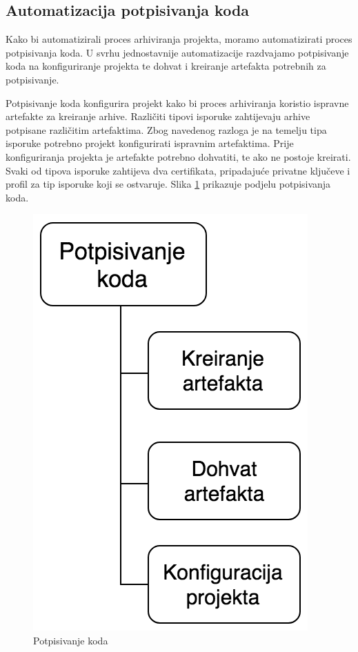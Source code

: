 \documentclass[times, utf8, diplomski, numeric]{fer}
\begin{document}
\subsection{Automatizacija potpisivanja koda}

Kako bi automatizirali proces arhiviranja projekta, moramo automatizirati proces potpisivanja koda. U svrhu jednostavnije automatizacije razdvajamo potpisivanje koda na konfiguriranje projekta te dohvat i kreiranje artefakta potrebnih za potpisivanje.

Potpisivanje koda konfigurira projekt kako bi proces arhiviranja koristio ispravne artefakte za kreiranje arhive. Različiti tipovi isporuke zahtijevaju arhive potpisane različitim artefaktima. Zbog navedenog razloga je na temelju tipa isporuke potrebno projekt konfigurirati ispravnim artefaktima. Prije konfiguriranja projekta je artefakte potrebno dohvatiti, te ako ne postoje kreirati. Svaki od tipova isporuke zahtijeva dva certifikata, pripadajuće privatne ključeve i profil za tip isporuke koji se ostvaruje. Slika \ref{fig:CodeSigning} prikazuje podjelu potpisivanja koda.

\begin{figure}
\centering
\includegraphics[scale=0.6]{CodeSigning}
\caption{Potpisivanje koda}
\label{fig:CodeSigning}
\end{figure}
\end{document}
